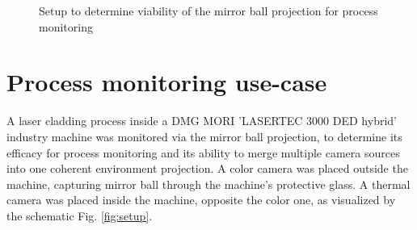 \documentclass[10pt]{article}
\begin{document}
\begin{multicols}{2}
	\begin{figure}
		\hfill
		\hfill
		\hfill
		\caption{Setup to determine viability of the mirror ball projection for process monitoring}
		\label{fig:monitoring}
	\end{figure}

	\section{Process monitoring use-case}
	A laser cladding process inside a DMG MORI 'LASERTEC 3000 DED hybrid' industry machine was monitored via the mirror ball projection, to determine its efficacy for process monitoring and its ability to merge multiple camera sources into one coherent environment projection. A color camera was placed outside the machine, capturing mirror ball through the machine's protective glass. A thermal camera was placed inside the machine, opposite the color one, as visualized by the schematic Fig. \ref{fig:setup}. 
	

\end{multicols}
\end{document}
